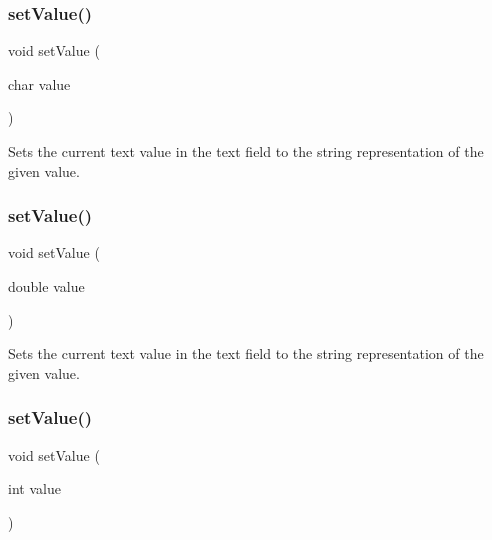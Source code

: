\subsubsection{\texorpdfstring{set\+Value()}{setValue()}\hspace{0.1cm}{\footnotesize\ttfamily [2/5]}}
{\footnotesize\ttfamily void set\+Value (\begin{DoxyParamCaption}\item[{char}]{value }\end{DoxyParamCaption})\hspace{0.3cm}{\ttfamily [virtual]}}



Sets the current text value in the text field to the string representation of the given value. 

\mbox{\label{classsgl_1_1GTextField_a1a31743bc7def7cf7fdad044c84d9268}} 
\subsubsection{\texorpdfstring{set\+Value()}{setValue()}\hspace{0.1cm}{\footnotesize\ttfamily [3/5]}}
{\footnotesize\ttfamily void set\+Value (\begin{DoxyParamCaption}\item[{double}]{value }\end{DoxyParamCaption})\hspace{0.3cm}{\ttfamily [virtual]}}



Sets the current text value in the text field to the string representation of the given value. 

\mbox{\label{classsgl_1_1GTextField_a23d79e21b8ed72e19278ca31d47b8c87}} 
\subsubsection{\texorpdfstring{set\+Value()}{setValue()}\hspace{0.1cm}{\footnotesize\ttfamily [4/5]}}
{\footnotesize\ttfamily void set\+Value (\begin{DoxyParamCaption}\item[{int}]{value }\end{DoxyParamCaption})\hspace{0.3cm}{\ttfamily [virtual]}}



